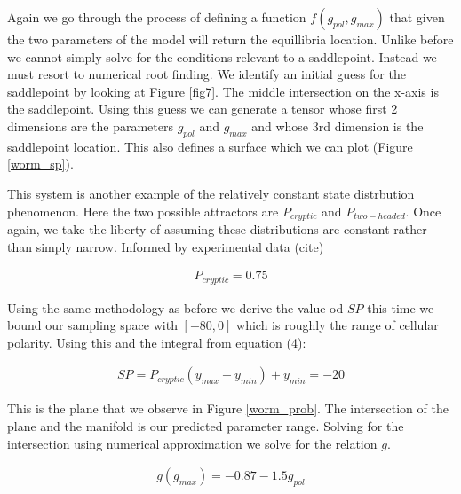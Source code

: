\documentclass[letterpaper]{article}
\begin{document}
Again we go through the process of defining a function $f(g_{pol},g_{max})$ that
given the two parameters of the model will return the equillibria location. Unlike 
before we cannot simply solve for the conditions relevant to a saddlepoint. Instead
we must resort to numerical root finding. We identify an initial guess for the 
saddlepoint 
by looking at Figure \ref{fig7}. The middle intersection on the x-axis is the 
saddlepoint.
Using this guess we can generate a tensor whose first 2 dimensions are the parameters 
$g_{pol}$ and $g_{max}$ and whose 3rd dimension is the saddlepoint location. This also
defines a surface which we can plot (Figure \ref{worm_sp}).

This system is another example of the relatively constant state distrbution phenomenon.
Here the two possible attractors are $P_{cryptic}$ and $P_{two-headed}$. Once again,
we take the liberty of assuming these distributions are constant rather than simply 
narrow. Informed by experimental data (cite)

\begin{eqnarray}
  P_{cryptic} = 0.75
\end{eqnarray}

Using the same methodology as before we derive the value od $SP$ this time we bound
our sampling space with $[-80,0]$ which is roughly the range of cellular polarity. 
Using this and the integral from equation (4):

\begin{eqnarray}
  SP = P_{cryptic}(y_{max}-y_{min}) + y_{min} = -20
\end{eqnarray}

This is the plane that we observe in Figure \ref{worm_prob}. The intersection
of the plane and the manifold is our predicted parameter range. Solving for the 
intersection using numerical approximation we solve for the relation $g$.

\begin{eqnarray}
  g(g_{max}) = -0.87 - 1.5 g_{pol}
\end{eqnarray}
\end{document}
